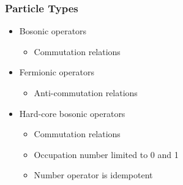    \begin{frame}[t]
        \frametitle{Particle Types}
        
        \vspace{-0.4cm}

        \begin{minipage}[t]{0.5\textwidth}
            \vspace{0pt}
            \begin{itemize}
                \item Bosonic operators
                \begin{itemize}
                    \item Commutation relations
                \end{itemize}
                \item Fermionic operators
                \begin{itemize}
                    \item Anti-commutation relations
                \end{itemize}
                \item Hard-core bosonic operators \pause
                \begin{itemize}
                    \item Commutation relations \pause
                    \item Occupation number limited to 0 and 1  \pause
                    \item Number operator is idempotent
                \end{itemize}
            \end{itemize}
        \end{minipage}%
        \onslide
        \hfill
        \begin{minipage}[t]{0.45\textwidth}
            \vspace{0pt}
        \end{minipage}

        \onslide %
    \end{frame}


